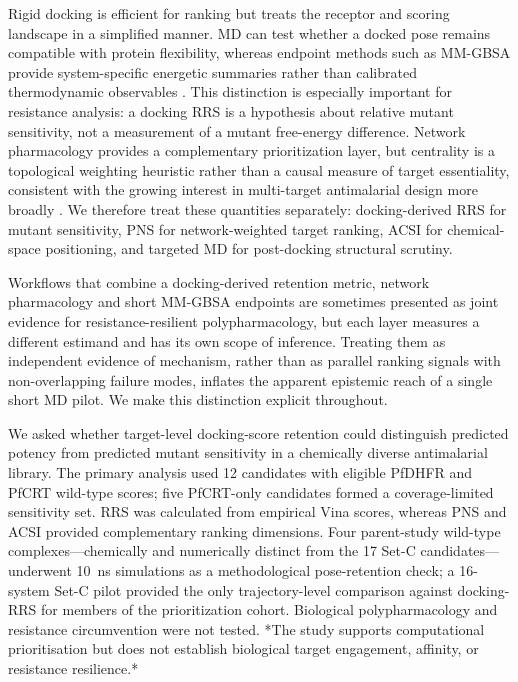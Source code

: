 \documentclass[journal=jcisd8,manuscript=article,layout=traditional]{achemso}
\begin{document}
Rigid docking is efficient for ranking but treats the receptor and scoring landscape in a simplified manner. MD can test whether a docked pose remains compatible with protein flexibility, whereas endpoint methods such as MM-GBSA provide system-specific energetic summaries rather than calibrated thermodynamic observables \citep{gmx_mmpbsa_2021,wang2019_mmgbsa}. This distinction is especially important for resistance analysis: a docking RRS is a hypothesis about relative mutant sensitivity, not a measurement of a mutant free-energy difference. Network pharmacology provides a complementary prioritization layer, but centrality is a topological weighting heuristic rather than a causal measure of target essentiality, consistent with the growing interest in multi-target antimalarial design more broadly \citep{multi_target_antimalarials_2025}. We therefore treat these quantities separately: docking-derived RRS for mutant sensitivity, PNS for network-weighted target ranking, ACSI for chemical-space positioning, and targeted MD for post-docking structural scrutiny.

Workflows that combine a docking-derived retention metric, network pharmacology and short MM-GBSA endpoints are sometimes presented as joint evidence for resistance-resilient polypharmacology, but each layer measures a different estimand and has its own scope of inference. Treating them as independent evidence of mechanism, rather than as parallel ranking signals with non-overlapping failure modes, inflates the apparent epistemic reach of a single short MD pilot. We make this distinction explicit throughout.

We asked whether target-level docking-score retention could distinguish predicted potency from predicted mutant sensitivity in a chemically diverse antimalarial library. The primary analysis used \num{12} candidates with eligible PfDHFR and PfCRT wild-type scores; five PfCRT-only candidates formed a coverage-limited sensitivity set. RRS was calculated from empirical Vina scores, whereas PNS and ACSI provided complementary ranking dimensions. Four parent-study wild-type complexes---chemically and numerically distinct from the 17 Set-C candidates---underwent \qty{10}{\nano\second} simulations as a methodological pose-retention check; a 16-system Set-C pilot provided the only trajectory-level comparison against docking-RRS for members of the prioritization cohort. Biological polypharmacology and resistance circumvention were not tested. *The study supports computational prioritisation but does not establish biological target engagement, affinity, or resistance resilience.*
\end{document}
